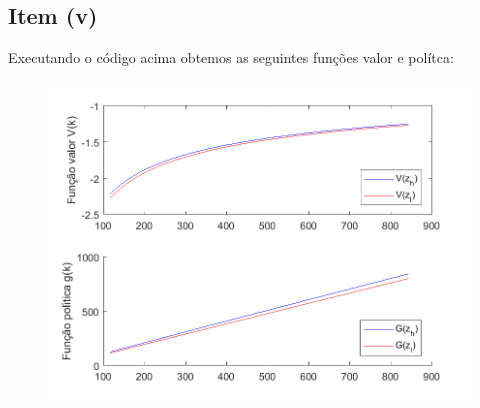\documentclass{article}
\begin{document}
\subsection*{Item (v)}

Executando o código acima obtemos as seguintes funções valor e polítca:

\begin{figure}[!h]
  \includegraphics{ex3_1.png}
\end{figure}
\end{document}
